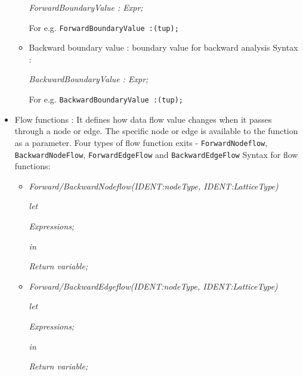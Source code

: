 \documentclass[11pt,a4paper,openright]{report}
\begin{document}
\begin{itemize}
\begin{itemize}
					    \hspace{15mm} \textit{ForwardBoundaryValue : Expr;}
					    
					    \hspace{15mm} For e.g. \texttt{ForwardBoundaryValue :(tup){};}
	\item Backward boundary value : boundary value for backward analysis
	 \newline Syntax : 
			  
					    \hspace{15mm} \textit{BackwardBoundaryValue : Expr;}
					    
					    \hspace{15mm} For e.g. \texttt{BackwardBoundaryValue :(tup){};}

					   
\end{itemize}

\item Flow functions : It defines how data flow value changes when it passes through a node or edge. The specific node or edge is available to the function as a parameter.
Four types of flow function exits - \texttt{ForwardNodeflow}, \texttt{BackwardNodeFlow}, \texttt{ForwardEdgeFlow} and \texttt{BackwardEdgeFlow}
\newline Syntax for flow functions:
\begin{itemize}
 \item 

\textit{Forward/BackwardNodeflow(IDENT:nodeType, IDENT:LatticeType)}

\textit{let}

\hspace{10mm} \textit{Expressions;}

\textit{in}

\hspace{10mm}\textit{Return variable;}
 
 \item

\textit{Forward/BackwardEdgeflow(IDENT:nodeType, IDENT:LatticeType)}

\textit{let}

\hspace{10mm}\textit{Expressions;}

\textit{in}

\hspace{10mm}\textit{Return variable;}
  
\end{itemize}

\end{itemize}
\end{document}
